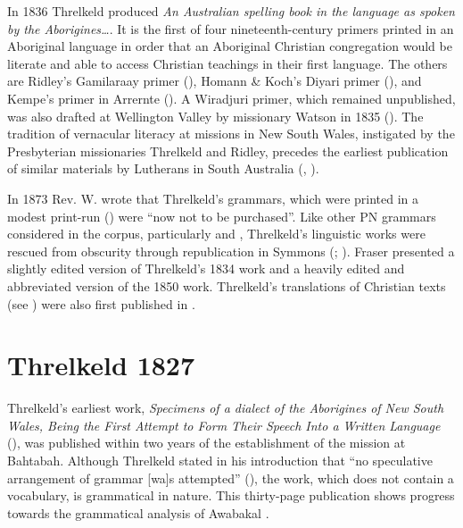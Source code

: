 In 1836 Threlkeld produced \textit{An Australian spelling book in the language as spoken by the Aborigines…}. It is the first of four nineteenth-century primers printed in an Aboriginal language in order that an Aboriginal Christian congregation would be literate and able to access Christian teachings in their first language. The others are Ridley’s Gamilaraay primer (\citeyear{ridley_gurre_1856}), Homann \& Koch’s Diyari primer (\citeyear{koch_nujanujarajinkiniexa_1870}), and Kempe’s primer in Arrernte (\citeyear{kempe_intalinja_1880}). A Wiradjuri primer, which remained unpublished, was also drafted at Wellington Valley by missionary Watson in 1835 (\citealt[413]{bridges_church_1978}). The tradition of vernacular literacy at missions in New South Wales, instigated by the Presbyterian missionaries Threlkeld and Ridley, precedes the earliest publication of similar materials by Lutherans in South Australia (, ).

In 1873 Rev. W. \citet[275]{ridley_report_1873} wrote that Threlkeld’s grammars, which were printed in a modest print-run (\citealt[169]{newton_more_1987}) were “now not to be purchased”. Like other PN grammars considered in the corpus, particularly \citet{gunther_lecture_1840} and \citet{symmons_grammatical_1841}, Threlkeld’s linguistic works were rescued from obscurity through republication in Symmons (\citeyear{symmons_grammar_1892}; ). Fraser presented a slightly edited version of Threlkeld’s 1834 work and a heavily edited and abbreviated version of the 1850 work. Threlkeld’s translations of Christian texts (see \citealt[170]{newton_more_1987}) were also first published in \citet{symmons_grammar_1892}.

\section{Threlkeld 1827}
\label{sec:key:3.2}

Threlkeld’s earliest work, \textit{Specimens of a dialect of the Aborigines of New South Wales, Being the First Attempt to Form Their Speech Into a Written Language} (\citealt{threlkeld_specimens_1927}), was published within two years of the establishment of the mission at Bahtabah. Although Threlkeld stated in his introduction that “no speculative arrangement of grammar [wa]s attempted” (\citealt[iii]{threlkeld_specimens_1927}), the work, which does not contain a vocabulary, is grammatical in nature. This thirty-page publication shows progress towards the grammatical analysis of Awabakal \citep{threlkeld_australian_1834}. 

